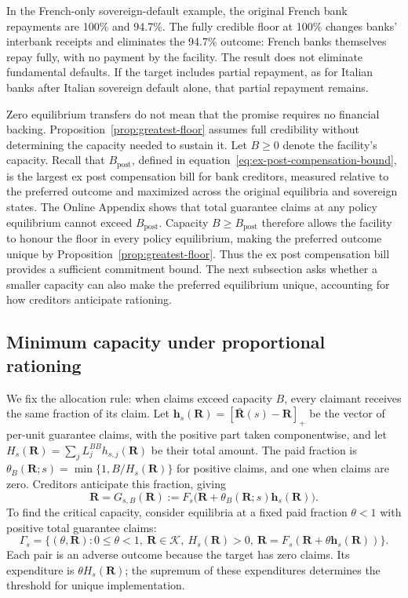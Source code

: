 In the French-only sovereign-default example, the original French bank repayments are 100\% and 94.7\%. The fully credible floor at 100\% changes banks' interbank receipts and eliminates the 94.7\% outcome: French banks themselves repay fully, with no payment by the facility. The result does not eliminate fundamental defaults. If the target includes partial repayment, as for Italian banks after Italian sovereign default alone, that partial repayment remains.

Zero equilibrium transfers do not mean that the promise requires no financial backing. Proposition~\ref{prop:greatest-floor} assumes full credibility without determining the capacity needed to sustain it. Let $B\geq0$ denote the facility's capacity. Recall that $B_{\mathrm{post}}$, defined in equation~\eqref{eq:ex-post-compensation-bound}, is the largest ex post compensation bill for bank creditors, measured relative to the preferred outcome and maximized across the original equilibria and sovereign states. The Online Appendix shows that total guarantee claims at any policy equilibrium cannot exceed $B_{\mathrm{post}}$. Capacity $B\geq B_{\mathrm{post}}$ therefore allows the facility to honour the floor in every policy equilibrium, making the preferred outcome unique by Proposition~\ref{prop:greatest-floor}. Thus the ex post compensation bill provides a sufficient commitment bound. The next subsection asks whether a smaller capacity can also make the preferred equilibrium unique, accounting for how creditors anticipate rationing.

\subsection{Minimum capacity under proportional rationing}\label{sec:minimum-floor-budget}

We fix the allocation rule: when claims exceed capacity $B$, every claimant receives the same fraction of its claim. Let $\mathbf{h}_s(\mathbf{R})=[\bar{\mathbf{R}}(s)-\mathbf{R}]_+$ be the vector of per-unit guarantee claims, with the positive part taken componentwise, and let $H_s(\mathbf{R})=\sum_jL_j^{BB}h_{s,j}(\mathbf{R})$ be their total amount. The paid fraction is $\theta_B(\mathbf{R};s)=\min\{1,B/H_s(\mathbf{R})\}$ for positive claims, and one when claims are zero. Creditors anticipate this fraction, giving
\[
 \mathbf{R}=G_{s,B}(\mathbf{R}):=F_s\bigl(\mathbf{R}+\theta_B(\mathbf{R};s)\mathbf{h}_s(\mathbf{R})\bigr).
\]
To find the critical capacity, consider equilibria at a fixed paid fraction $\theta<1$ with positive total guarantee claims:
\[
 \Gamma_s=\{(\theta,\mathbf{R}):0\leq\theta<1,\ \mathbf{R}\in\mathcal K,\ H_s(\mathbf{R})>0,\
 \mathbf{R}=F_s(\mathbf{R}+\theta \mathbf{h}_s(\mathbf{R}))\}.
\]
Each pair is an adverse outcome because the target has zero claims. Its expenditure is $\theta H_s(\mathbf{R})$; the supremum of these expenditures determines the threshold for unique implementation.

